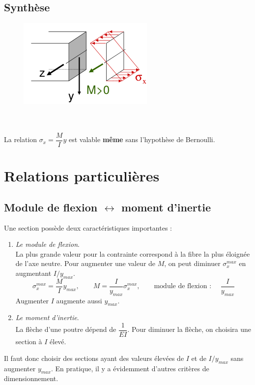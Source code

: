 	\subsection{Synthèse}
\vspace{-1cm}
	\begin{figure}
	\vspace{-2mm}
	\includegraphics[scale=0.45]{ch4/image3.png}
	\end{figure}\ \\
	
	\ \\
	La relation $\sigma_x=\dfrac{M}{I}y$ est valable \textbf{même} sans 
	l'hypothèse de Bernoulli.
	
\section{Relations particulières}
	\subsection{Module de flexion $\leftrightarrow$ moment d’inertie}
	Une section possède deux caractéristiques importantes : 
	\begin{enumerate}
	\item \textit{Le module de flexion}.\\
	La plus grande valeur pour la contrainte correspond à la fibre la plus 
	éloignée de l'axe neutre. Pour augmenter une valeur de $M$, on peut 
	diminuer $\sigma_x^{max}$ en augmentant $I/y_{max}$.
	\begin{equation}
	\sigma_x^{max} = \dfrac{M}{I}y_{max},\qquad M=\dfrac{I}{y_{max}}\sigma_x^{
	max},\qquad \text{module de flexion : }\quad \dfrac{I}{y_{max}}
	\end{equation}
	\danger Augmenter $I$ augmente aussi $y_{max}$.
	
	\item \textit{Le moment d'inertie}.\\
	La flèche d'une poutre dépend de $\dfrac{1}{EI}$. Pour diminuer la flèche, 
	on choisira une section à $I$ élevé.
	\end{enumerate}
	Il faut donc choisir des sections ayant des valeurs élevées de $I$ et 
	de $I/y_{max}$ sans augmenter $y_{max}$. En pratique, il y a évidemment 
	d'autres critères de dimensionnement.
	

